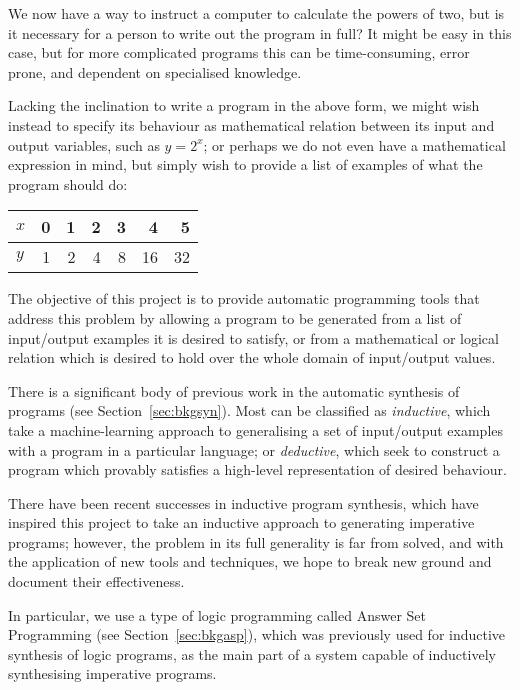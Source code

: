 \documentclass[a4paper,twoside,notitlepage]{article}
\begin{document}
We now have a way to instruct a computer to calculate the powers of two, 
but is it necessary for a person to write out the program in full? It 
might be easy in this case, but for more complicated programs this can be 
time-consuming, error prone, and dependent on specialised knowledge.

Lacking the inclination to write a program in the above form, we might 
wish instead to specify its behaviour as mathematical relation between 
its input and output variables, such as $y = 2^x$; or perhaps we do not 
even have a mathematical expression in mind, but simply wish to provide a 
list of examples of what the program should do:
\begin{center}
\begin{tabular}{| l || r | r | r | r | r | r |}
    \hline
    $x$ & 0 & 1 & 2 & 3 & 4  &  5 \\
    \hline
    $y$ & 1 & 2 & 4 & 8 & 16 & 32 \\
    \hline
\end{tabular}
\end{center}

The objective of this project is to provide automatic programming tools 
that address this problem by allowing a program to be generated from a 
list of input/output examples it is desired to satisfy, or from a 
mathematical or logical relation which is desired to hold over the whole 
domain of input/output values.
\clearpage

There is a significant body of previous work in the automatic synthesis of 
programs (see Section~\ref{sec:bkgsyn}). Most can be classified as 
\emph{inductive}, which take a machine-learning approach to generalising a 
set of input/output examples with a program in a particular language; or 
\emph{deductive}, which seek to construct a program which provably 
satisfies a high-level representation of desired behaviour.

There have been recent successes in inductive program synthesis, which 
have inspired this project to take an inductive approach to generating 
imperative programs; however, the problem in its full generality is far 
from solved, and with the application of new tools and techniques, we hope 
to break new ground and document their effectiveness.

In particular, we use a type of logic programming called Answer Set 
Programming (see Section~\ref{sec:bkgasp}), which was previously used for 
inductive synthesis of logic programs, as the main part of a system 
capable of inductively synthesising imperative programs.
\end{document}
